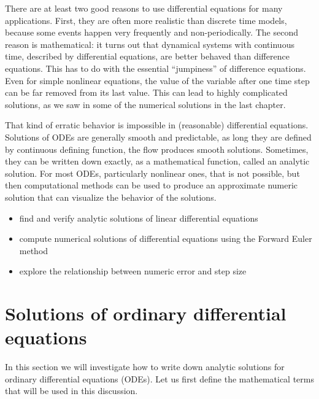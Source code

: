 \documentclass[
  letterpaper,
  DIV=11,
  numbers=noendperiod]{scrreprt}
\begin{document}
There are at least two good reasons to use differential equations for
many applications. First, they are often more realistic than discrete
time models, because some events happen very frequently and
non-periodically. The second reason is mathematical: it turns out that
dynamical systems with continuous time, described by differential
equations, are better behaved than difference equations. This has to do
with the essential ``jumpiness'' of difference equations. Even for
simple nonlinear equations, the value of the variable after one time
step can be far removed from its last value. This can lead to highly
complicated solutions, as we saw in some of the numerical solutions in
the last chapter.

That kind of erratic behavior is impossible in (reasonable) differential
equations. Solutions of ODEs are generally smooth and predictable, as
long they are defined by continuous defining function, the flow produces
smooth solutions. Sometimes, they can be written down exactly, as a
mathematical function, called an analytic solution. For most ODEs,
particularly nonlinear ones, that is not possible, but then
computational methods can be used to produce an approximate numeric
solution that can visualize the behavior of the solutions.

\begin{itemize}
\item
  find and verify analytic solutions of linear differential equations
\item
  compute numerical solutions of differential equations using the
  Forward Euler method
\item
  explore the relationship between numeric error and step size
\end{itemize}

\hypertarget{solutions-of-ordinary-differential-equations-1}{%
\section{Solutions of ordinary differential
equations}\label{solutions-of-ordinary-differential-equations-1}}

\label{sec:math15}

In this section we will investigate how to write down analytic solutions
for ordinary differential equations (ODEs). Let us first define the
mathematical terms that will be used in this discussion.
\end{document}
